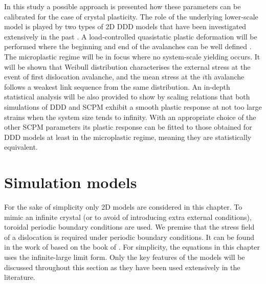 In this study a possible approach is presented 	how these parameters can be calibrated for the case of crystal plasticity. The role of the underlying lower-scale model is played by two types of 2D DDD models that have been investigated extensively in the past \cite{miguel2001intermittent,PhysRevLett.106.105501,ovaska2015quenched,1742-5468-2015-8-P08009}. A load-controlled quasistatic plastic deformation will be performed where the beginning and end of the avalanches can be well defined \cite{PhysRevLett.112.235501}. The microplastic regime will be in focus where no system-scale yielding occurs. It will be shown that Weibull distribution characterises the external stress at the event of first dislocation avalanche, and the mean stress at the $i$th avalanche follows a weakest link sequence from the same distribution. An in-depth statistical analysis will be also provided to show by scaling relations that both simulations of DDD and SCPM exhibit a smooth plastic response at not too large strains when the system size tends to infinity. With an appropriate choice of the other SCPM parameters its plastic response can be fitted to those obtained for DDD models at least in the microplastic regime, meaning they are statistically equivalent.

\section{Simulation models}
For the sake of simplicity only 2D models are considered in this chapter. To mimic an infinite crystal (or to avoid of introducing extra external conditions), toroidal periodic boundary conditions are used. We premise that the stress field of a dislocation is required under periodic boundary conditions. It can be found in the work of \citet{BAKO200622} based on the book of \citet{hirth1982theory}. For simplicity, the equations in this chapter uses the infinite-large limit form. Only the key features of the models will be discussed throughout this section as they have been used extensively in the literature.

